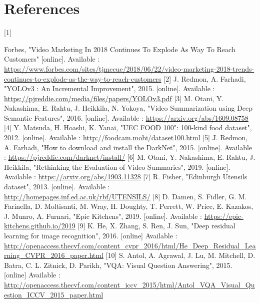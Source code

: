 \documentclass{article}
\begin{document}
\section{References}
\hypertarget{ref1}{[1]} Forbes, "Video Marketing In 2018 Continues To Explode As Way To Reach Customers" [online]. Available :  \href{https://www.forbes.com/sites/tjmccue/2018/06/22/video-marketing-2018-trends-continues-to-explode-as-the-way-to-reach-customers}{https://www.forbes.com/sites/tjmccue/2018/06/22/video-marketing-2018-trends-continues-to-explode-as-the-way-to-reach-customers}
\newline
\hypertarget{ref2}{[2]} J. Redmon, A. Farhadi, "YOLOv3 : An Incremental Improvement", 2015. [online]. Available :  \url{https://pjreddie.com/media/files/papers/YOLOv3.pdf}
\newline
\hypertarget{ref3}{[3]} M. Otani, Y. Nakashima, E. Rahtu, J. Heikkila, N. Yokoya, "Video Summarization using Deep Semantic Features", 2016. [online]. Available : \url{https://arxiv.org/abs/1609.08758}
\newline
\hypertarget{ref4}{[4]} Y. Matsuda, H. Hoashi, K. Yanai, "UEC FOOD 100": 100-kind food dataset", 2012. [online]. Available : \url{http://foodcam.mobi/dataset100.html}
\newline
\hypertarget{ref5}{[5]} J. Redmon, A. Farhadi, "How to download and install the DarkNet", 2015. [online]. Available :  \url{https://pjreddie.com/darknet/install/}
\newline
\hypertarget{ref6}{[6]} M. Otani, Y. Nakashima, E. Rahtu, J. Heikkila, "Rethinking the Evaluation of Video Summaries", 2019. [online]. Available :  \url{https://arxiv.org/abs/1903.11328}
\newline
\hypertarget{ref7}{[7]} R. Fisher, "Edinburgh Utensils dataset", 2013. [online]. Available :  \url{http://homepages.inf.ed.ac.uk/rbf/UTENSILS/}
\newline
\hypertarget{ref8}{[8]}  D. Damen, S. Fidler, G. M. Farinella, D. Moltisanti, M. Wray, H. Doughty, T. Perrett, W. Price, E. Kazakos, J. Munro, A. Furnari, "Epic Kitchens", 2019. [online]. Available :  \url{https://epic-kitchens.github.io/2019}
\newline
\hypertarget{ref9}{[9]}  K. He, X. Zhang, S. Ren, J. Sun, "Deep residual learning for image recognition", 2016. [online] Available : \url{http://openaccess.thecvf.com/content_cvpr_2016/html/He_Deep_Residual_Learning_CVPR_2016_paper.html}
\newline
\hypertarget{ref10}{[10]}  S. Antol, A. Agrawal, J. Lu, M. Mitchell, D. Batra, C. L. Zitnick, D. Parikh, "VQA: Visual Question Answering", 2015. [online] Available : \url{http://openaccess.thecvf.com/content_iccv_2015/html/Antol_VQA_Visual_Question_ICCV_2015_paper.html}
\end{document}
